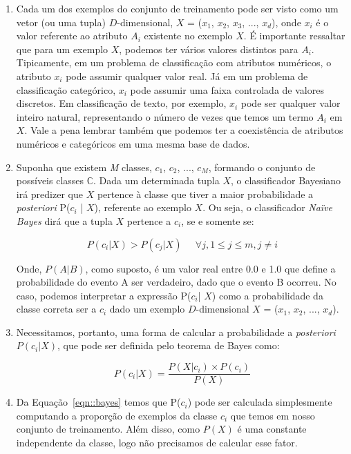 \begin{enumerate}
    \item Cada um dos exemplos do conjunto de treinamento pode ser visto como um vetor (ou uma tupla) $D$-dimensional, $X$ = ($x_1$, $x_2$, $x_3$, ..., $x_d$), onde $x_i$ é o valor referente ao atributo $A_i$ existente no exemplo $X$. É importante ressaltar que para um exemplo $X$, podemos ter vários valores distintos para $A_i$. Tipicamente, em um problema de classificação com atributos numéricos, o atributo $x_i$ pode assumir qualquer valor real. Já em um problema de classificação categórico, $x_i$ pode assumir uma faixa controlada de valores discretos. Em classificação de texto, por exemplo, $x_i$ pode ser qualquer valor inteiro natural, representando o número de vezes que temos um termo $A_i$ em $X$. Vale a pena lembrar também que podemos ter a coexistência de atributos numéricos e categóricos em uma mesma base de dados.
    

    \item Suponha que existem \textit{M} classes, $c_1$, $c_2$, ..., $c_\textit{M}$, formando o conjunto de possíveis classes $\mathbb{C}$. Dada um determinada tupla $X$, o classificador Bayesiano irá predizer que $X$ pertence à classe que tiver a maior probabilidade a \textit{posteriori} P($c_i$ | $X$), referente ao exemplo $X$. Ou seja, o classificador \textit{Naïve Bayes} dirá que a tupla $X$ pertence a $c_i$, se e somente se:
        
\begin{equation}\label{eqn::max_pcgivenx}
   P(c_{i}|X) > P(c_{j}|X) \;\;\;\;\;\forall j, 1 \le j \le m, j \not= i
\end{equation}

Onde, $P(A|B)$, como suposto, é um valor real entre 0.0 e 1.0 que define a probabilidade do evento A ser verdadeiro, dado que o evento B ocorreu. No caso, podemos interpretar a expressão P($c_i$| $X$) como a probabilidade da classe correta ser a $c_i$ dado um exemplo $D$-dimensional $X$ = ($x_1$, $x_2$, ..., $x_d$).

    \item Necessitamos, portanto, uma forma de calcular a probabilidade a \textit{posteriori} $P(c_i| X)$, que pode ser definida pelo teorema de Bayes como:
 
\begin{equation}\label{eqn::bayes}
   P(c_{i}|X) = \frac{P(X|c_i) \times P(c_i) }{P(X)}
\end{equation}

    \item Da Equação~\ref{eqn::bayes} temos que P($c_i$) pode ser calculada simplesmente computando a proporção de exemplos da classe $c_i$ que temos em nosso conjunto de treinamento. Além disso, como $P(X)$ é uma constante independente da classe, logo não precisamos de calcular esse fator.
       

\end{enumerate}
